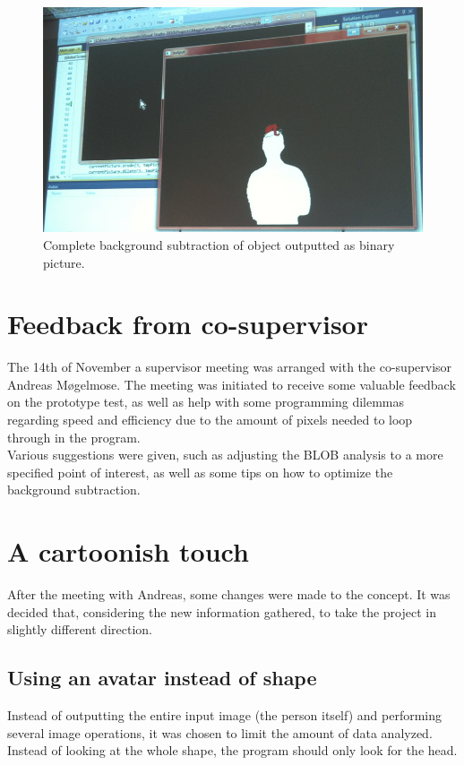 \begin{figure}[htbp]
\centering
\includegraphics[width=1.00\textwidth]{Pictures/Test/MaxSubtracted.jpg}
\caption{Complete background subtraction of object outputted as binary picture.}
\label{fig:max_subtracted}
\end{figure}

\section{Feedback from co-supervisor}
The 14th of November a supervisor meeting was arranged with the co-supervisor Andreas M{\o}gelmose. The meeting was initiated to receive some valuable feedback on the prototype test, as well as help with some programming dilemmas regarding speed and efficiency due to the amount of pixels needed to loop through in the program.\\
Various suggestions were given, such as adjusting the BLOB analysis to a more specified point of interest, as well as some tips on how to optimize the background subtraction.

\section{A cartoonish touch}
After the meeting with Andreas, some changes were made to the concept. It was decided that, considering the new information gathered, to take the project in slightly different direction.

\subsection{Using an avatar instead of shape}
Instead of outputting the entire input image (the person itself) and performing several image operations, it was chosen to limit the amount of data analyzed. Instead of looking at the whole shape, the program should only look for the head.

